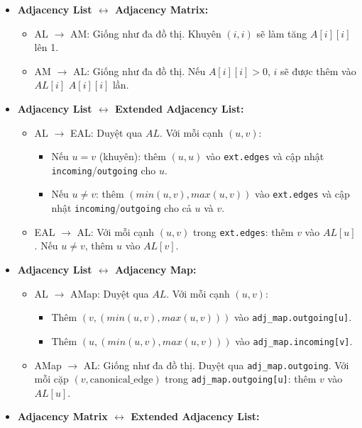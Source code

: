 \documentclass{article}
\begin{document}
\begin{itemize}
    \item \textbf{Adjacency List $\leftrightarrow$ Adjacency Matrix:}
    \begin{itemize}
        \item AL $\to$ AM: Giống như đa đồ thị. Khuyên $(i,i)$ sẽ làm tăng $A[i][i]$ lên 1.
        \item AM $\to$ AL: Giống như đa đồ thị. Nếu $A[i][i] > 0$, $i$ sẽ được thêm vào $AL[i]$ $A[i][i]$ lần.
    \end{itemize}
    \item \textbf{Adjacency List $\leftrightarrow$ Extended Adjacency List:}
    \begin{itemize}
        \item AL $\to$ EAL: Duyệt qua $AL$. Với mỗi cạnh $(u,v)$:
        \begin{itemize}
            \item Nếu $u = v$ (khuyên): thêm $(u,u)$ vào \texttt{ext.edges} và cập nhật \texttt{incoming}/\texttt{outgoing} cho $u$.
            \item Nếu $u \neq v$: thêm $(min(u,v), max(u,v))$ vào \texttt{ext.edges} và cập nhật \texttt{incoming}/\texttt{outgoing} cho cả $u$ và $v$.
        \end{itemize}
        \item EAL $\to$ AL: Với mỗi cạnh $(u,v)$ trong \texttt{ext.edges}: thêm $v$ vào $AL[u]$. Nếu $u \neq v$, thêm $u$ vào $AL[v]$.
    \end{itemize}
    \item \textbf{Adjacency List $\leftrightarrow$ Adjacency Map:}
    \begin{itemize}
        \item AL $\to$ AMap: Duyệt qua $AL$. Với mỗi cạnh $(u,v)$:
        \begin{itemize}
            \item Thêm $(v, (min(u,v), max(u,v)))$ vào \texttt{adj\_map.outgoing[u]}.
            \item Thêm $(u, (min(u,v), max(u,v)))$ vào \texttt{adj\_map.incoming[v]}.
        \end{itemize}
        \item AMap $\to$ AL: Giống như đa đồ thị. Duyệt qua \texttt{adj\_map.outgoing}. Với mỗi cặp $(v, \text{canonical\_edge})$ trong \texttt{adj\_map.outgoing[u]}: thêm $v$ vào $AL[u]$.
    \end{itemize}
    \item \textbf{Adjacency Matrix $\leftrightarrow$ Extended Adjacency List:}

\end{itemize}
\end{document}
